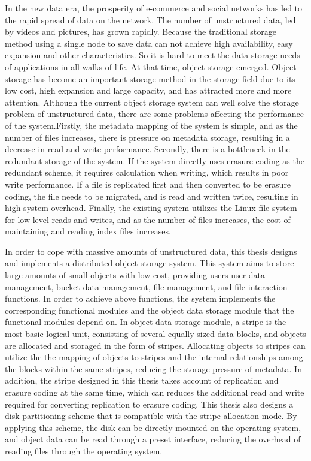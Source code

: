 \begin{abstract*}
In the new data era, the prosperity of e-commerce and social networks has led to the rapid spread of data on the network. The number of unstructured data, led by videos and pictures, has grown rapidly. Because the traditional storage method using a single node to save data can not achieve high availability, easy expansion and other characteristics. So it is hard to meet the data storage needs of applications in all walks of life. At that time, object storage emerged. Object storage has become an important storage method in the storage field due to its low cost, high expansion and large capacity, and has attracted more and more attention. Although the current object storage system can well solve the storage problem of unstructured data, there are some problems affecting the performance of the system.Firstly, the metadata mapping of the system is simple, and as the number of files increases, there is pressure on metadata storage, resulting in a decrease in read and write performance. Secondly, there is a bottleneck in the redundant storage of the system. If the system directly uses erasure coding as the redundant scheme, it requires calculation when writing, which results in poor write performance. If a file is replicated first and then converted to be erasure coding, the file needs to be migrated, and is read and written twice, resulting in high system overhead. Finally, the existing system utilizes the Linux file system for low-level reads and writes, and as the number of files increases, the cost of maintaining and reading index files increases.

In order to cope with massive amounts of unstructured data, this thesis designs and implements a distributed object storage system. This system aims to store large amounts of small objects with low cost, providing users user data management, bucket data management, file management, and file interaction functions. In order to achieve above functions, the system implements the corresponding functional modules and the object data storage module that the functional modules depend on. In object data storage module, a stripe is the most basic logical unit, consisting of several equally sized data blocks, and objects are allocated and storaged in the form of stripes. Allocating objects to stripes can utilize the the mapping of objects to stripes and the internal relationships among the blocks within the same stripes, reducing the storage pressure of metadata. In addition, the stripe designed in this thesis takes account of replication and erasure coding at the same time, which can reduces the additional read and write required for converting replication to erasure coding. This thesis also designs a disk partitioning scheme that is compatible with the stripe allocation mode. By applying this scheme, the disk can be directly mounted on the operating system, and object data can be read through a preset interface, reducing the overhead of reading files through the operating system.


\end{abstract*}
